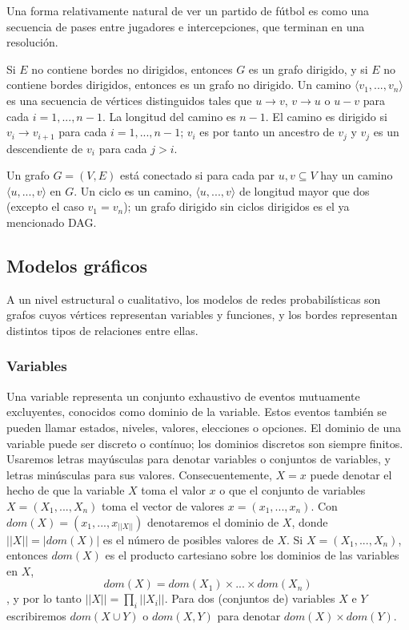 Una forma relativamente natural de ver un partido de fútbol es como una secuencia de 
pases entre jugadores e intercepciones, que terminan en una resolución. 

Si $E$ no contiene bordes no dirigidos, entonces $G$ es un grafo dirigido, y si $E$ no 
contiene bordes dirigidos, entonces es un grafo no dirigido. Un camino $ \langle v_{1},...,v_{n} \rangle $ 
es una secuencia de vértices distinguidos tales que $u \rightarrow v$, $v \rightarrow u$ o $u - v$ para 
cada $i= 1,..., n-1$. La longitud del camino es $n-1$. El camino es dirigido si $v_{i} \rightarrow v_{i+1}$ 
para cada $i= 1,..., n-1$; $v_{i}$ es por tanto un ancestro de $v_{j}$ y $v_{j}$ es un descendiente de 
$v_{i}$ para cada $j > i$. 

Un grafo $G= (V, E)$ está conectado si para cada par ${u, v} \subseteq V$ hay un camino 
$\langle u,...,v \rangle$ en $G$. Un ciclo es un camino, 
$\langle u,...,v \rangle$ de longitud mayor que dos (excepto el caso $v_{1} = v_{n}$); un grafo 
dirigido sin ciclos dirigidos es el ya mencionado DAG. 

\subsection{Modelos gráficos}
A un nivel estructural o cualitativo, los modelos de redes probabilísticas son grafos cuyos vértices 
representan variables y funciones, y los bordes representan distintos tipos de relaciones entre ellas. 

\subsubsection{Variables}
Una variable representa un conjunto exhaustivo de eventos mutuamente excluyentes, conocidos como dominio 
de la variable. Estos eventos también se pueden llamar estados, niveles, valores, elecciones o opciones. 
El dominio de una variable puede ser discreto o contínuo; los dominios discretos son siempre finitos. 
Usaremos letras mayúsculas para denotar variables o conjuntos de variables, y letras minúsculas para sus 
valores. Consecuentemente, $X = x$ puede denotar el hecho de que la variable $X$ toma el valor $x$ o que 
el conjunto de variables $X = (X_{1},...,X_{n})$ toma el vector de valores $x = (x_{1},...,x_{n})$. 
Con $dom(X)= (x_{1},...,x_{||X||})$ denotaremos el dominio de $X$, donde $||X|| = |dom(X)|$ es el número 
de posibles valores de $X$. Si $X = (X_{1},...,X_{n})$, entonces $dom(X)$ es el producto cartesiano sobre 
los dominios de las variables en $X$, $$dom(X)=dom(X_{1})\times ... \times dom(X_{n})$$, y por lo tanto 
$||X|| = \prod_i ||X_{i}||$. Para dos (conjuntos de) variables $X$ e $Y$ escribiremos $dom(X \cup Y)$ 
o $dom(X,Y)$ para denotar $dom(X) \times dom(Y)$.

